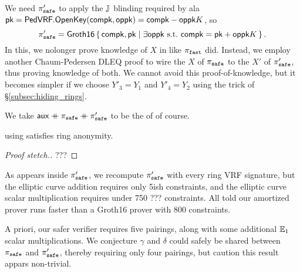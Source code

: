 We need $\pi_{\mathtt{safe}}'$ to apply the ${\mathbb{J}}$ blinding required by \PedVRF
ala $\mathsf{pk} = {\mathsf{PedVRF}}.{\mathsf{OpenKey}}(\mathsf{compk},\mathsf{oppk}) = \mathsf{compk} - \mathsf{oppk} K$, so
$$ \pisafe' = \rrSNARK \Setst{ \compk, \pk }{
 \exists \openpk \textrm{\ s.t.\ } \compk = \pk + \openpk \genB
} \mathperiod $$
In this, we nolonger prove knowledge of $X$ in \PedVRF like $\pi_{\mathtt{fast}}$ did.
Instead, we employ another Chaum-Pedersen DLEQ proof to wire
 the $X$ of $\pi_{\mathtt{safe}}$ to the $X'$ of $\pi_{\mathtt{safe}}'$,
 thus proving knowledge of both.
We cannot avoid this proof-of-knowledge, but it becomes simpler if
we choose $Y'_3 = Y_1$ and $Y'_4 = Y_2$ using the trick of \S\ref{subsec:hiding_rings}.

We take $\mathsf{aux} \mathbin{+\mkern-10mu+} \pi_{\mathtt{safe}} \mathbin{+\mkern-10mu+} \pi_{\mathtt{safe}}'$
 to be the \aux of \PedVRF of course.

\begin{proposition}\label{prop:pisafe_anonymity}
\rVRF using \pisafe satisfies ring anonymity.
\end{proposition}

\begin{proof}[Proof stetch.]
???
\end{proof}


As \openpk appears inside $\pi_{\mathtt{safe}}'$, we recompute $\pi_{\mathtt{safe}}'$ with
every ring VRF signature, but the elliptic curve addition requires
only 5ish constraints, and the elliptic curve scalar multiplication
requires under 750 ??? constraints. 
All told our amortized prover runs faster than a Groth16 prover
with 800 constraints.

A priori, our safer verifier requires five pairings, along with
some additional ${\mathbb{E}}_1$ scalar multiplications.
We conjecture $\gamma$ and $\delta$ could safely be shared between
$\pi_{\mathtt{safe}}$ and $\pi_{\mathtt{safe}}'$, thereby requiring only four pairings,
but caution this result appars non-trivial.


